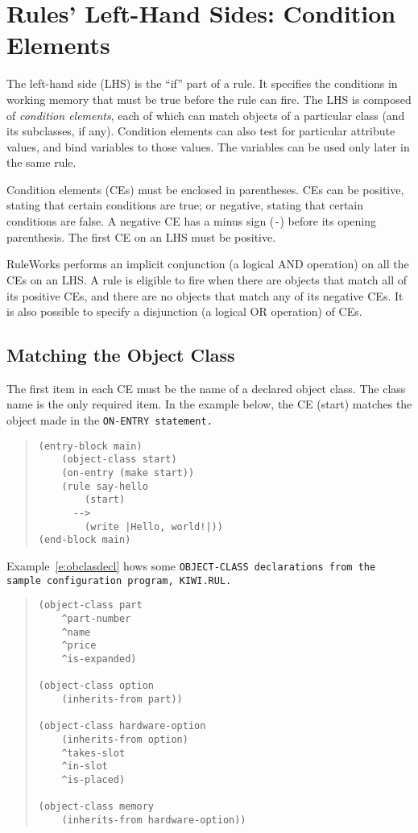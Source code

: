 \chapter{Rules' Left-Hand Sides: Condition Elements}
\label{c:conditionelements}

The left-hand side (LHS) is the ``if'' part of a rule. It specifies
the conditions in working memory that must be true before the rule can
fire. The LHS is composed of \emph{condition elements}, each of which
can match objects of a particular class (and its subclasses, if
any). Condition elements can also test for particular attribute
values, and bind variables to those values. The variables can be used
only later in the same rule.

Condition elements (CEs) must be enclosed in parentheses.  CEs can be
positive, stating that certain conditions are true; or negative,
stating that certain conditions are false. A negative CE has a minus
sign (\verb|-|) before its opening parenthesis. The first CE on an LHS
must be positive.

RuleWorks performs an implicit conjunction (a logical AND operation)
on all the CEs on an LHS. A rule is eligible to fire when there are
objects that match all of its positive CEs, and there are no objects
that match any of its negative CEs. It is also possible to specify a
disjunction (a logical OR operation) of CEs.

\section{Matching the Object Class}

The first item in each CE must be the name of a declared
object class. The class name is the only required item. In
the example below, the CE (start) matches the object made
in the \tt{ON-ENTRY} statement.

\begin{quote}
\begin{verbatim}
(entry-block main)
    (object-class start)
    (on-entry (make start))
    (rule say-hello
        (start)
      -->
        (write |Hello, world!|))
(end-block main)
\end{verbatim}
\end{quote}

Example~\ref{e:obclasdecl} hows some \tt{OBJECT-CLASS} declarations
from the sample configuration program, \tt{KIWI.RUL}.

\begin{example}[h]
\begin{quote}
\begin{verbatim}
(object-class part
    ^part-number
    ^name
    ^price
    ^is-expanded)

(object-class option
    (inherits-from part))

(object-class hardware-option
    (inherits-from option)
    ^takes-slot
    ^in-slot
    ^is-placed)

(object-class memory
    (inherits-from hardware-option))
\end{verbatim}
\end{quote}
\caption{Sample \tt{OBJECT-CLASS} Declarations}
\label{e:obclasdecl}
\end{example}

